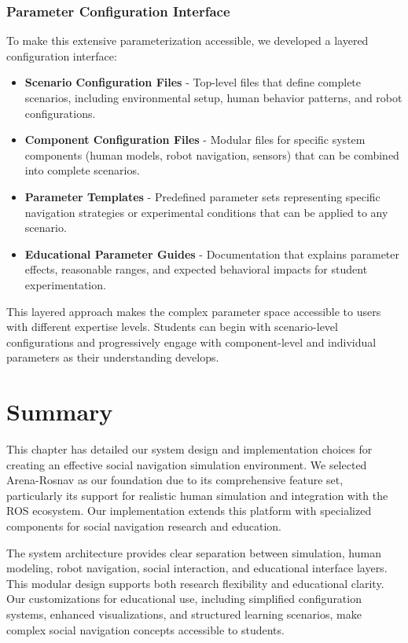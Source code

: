 \subsubsection{Parameter Configuration Interface}
To make this extensive parameterization accessible, we developed a layered 
configuration interface:
\begin{itemize}
    \item \textbf{Scenario Configuration Files} - Top-level files that define complete 
    scenarios, including environmental setup, human behavior patterns, and robot 
    configurations.
    \item \textbf{Component Configuration Files} - Modular files for specific system 
    components (human models, robot navigation, sensors) that can be combined into 
    complete scenarios.
    \item \textbf{Parameter Templates} - Predefined parameter sets representing specific 
    navigation strategies or experimental conditions that can be applied to any scenario.
    \item \textbf{Educational Parameter Guides} - Documentation that explains parameter 
    effects, reasonable ranges, and expected behavioral impacts for student experimentation.
\end{itemize}
This layered approach makes the complex parameter space accessible to users with different 
expertise levels. Students can begin with scenario-level configurations and progressively 
engage with component-level and individual parameters as their understanding develops.

\section{Summary}
This chapter has detailed our system design and implementation choices for creating an 
effective social navigation simulation environment. We selected Arena-Rosnav as our 
foundation due to its comprehensive feature set, particularly its support for realistic 
human simulation and integration with the ROS ecosystem. Our implementation extends this 
platform with specialized components for social navigation research and education.

The system architecture provides clear separation between simulation, human modeling, 
robot navigation, social interaction, and educational interface layers. This modular 
design supports both research flexibility and educational clarity. Our customizations 
for educational use, including simplified configuration systems, enhanced visualizations, 
and structured learning scenarios, make complex social navigation concepts accessible to 
students.

